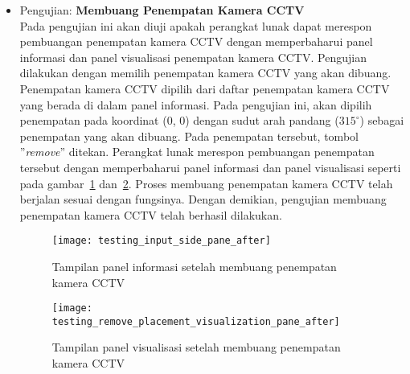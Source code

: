 \begin{itemize}
	\item Pengujian: \textbf{Membuang Penempatan Kamera CCTV}\\
	Pada pengujian ini akan diuji apakah perangkat lunak dapat merespon pembuangan penempatan kamera CCTV dengan memperbaharui panel informasi dan panel visualisasi penempatan kamera CCTV. Pengujian dilakukan dengan memilih penempatan kamera CCTV yang akan dibuang. Penempatan kamera CCTV dipilih dari daftar penempatan kamera CCTV yang berada di dalam panel informasi. Pada pengujian ini, akan dipilih penempatan pada koordinat (0, 0) dengan sudut arah pandang (\(315^\circ\)) sebagai penempatan yang akan dibuang. Pada penempatan tersebut, tombol ''\textit{remove}'' ditekan. Perangkat lunak merespon pembuangan penempatan tersebut dengan memperbaharui panel informasi dan panel visualisasi seperti pada gambar~\ref{fig:testing_remove_placement_information_pane_after} dan~\ref{fig:testing_remove_placement_visualization_pane_after}. Proses membuang penempatan kamera CCTV telah berjalan sesuai dengan fungsinya. Dengan demikian, pengujian membuang penempatan kamera CCTV telah berhasil dilakukan.
	
	 \begin{figure}[H]
		\centering  
		\texttt{[image: testing\_input\_side\_pane\_after]}
		\caption[Tampilan panel informasi setelah membuang penempatan kamera CCTV]{Tampilan panel informasi setelah membuang penempatan kamera CCTV}
		\label{fig:testing_remove_placement_information_pane_after}
	\end{figure}
	
	\begin{figure}[H]
		\centering  
		\texttt{[image: testing\_remove\_placement\_visualization\_pane\_after]}
		\caption[Tampilan panel visualisasi setelah membuang penempatan kamera CCTV]{Tampilan panel visualisasi setelah membuang penempatan kamera CCTV}
		\label{fig:testing_remove_placement_visualization_pane_after}
	\end{figure}
\end{itemize}

